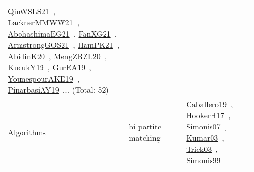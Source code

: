 {\begin{longtable}{lp{3cm}>{\raggedright\arraybackslash}p{6cm}>{\raggedright\arraybackslash}p{6cm}>{\raggedright\arraybackslash}p{8cm}}
\href{../works/QinWSLS21.pdf}{QinWSLS21}~\cite{QinWSLS21}, \href{../works/LacknerMMWW21.pdf}{LacknerMMWW21}~\cite{LacknerMMWW21}, \href{../works/AbohashimaEG21.pdf}{AbohashimaEG21}~\cite{AbohashimaEG21}, \href{../works/FanXG21.pdf}{FanXG21}~\cite{FanXG21}, \href{../works/ArmstrongGOS21.pdf}{ArmstrongGOS21}~\cite{ArmstrongGOS21}, \href{../works/HamPK21.pdf}{HamPK21}~\cite{HamPK21}, \href{../works/AbidinK20.pdf}{AbidinK20}~\cite{AbidinK20}, \href{../works/MengZRZL20.pdf}{MengZRZL20}~\cite{MengZRZL20}, \href{../works/KucukY19.pdf}{KucukY19}~\cite{KucukY19}, \href{../works/GurEA19.pdf}{GurEA19}~\cite{GurEA19}, \href{../works/YounespourAKE19.pdf}{YounespourAKE19}~\cite{YounespourAKE19}, \href{../works/PinarbasiAY19.pdf}{PinarbasiAY19}~\cite{PinarbasiAY19}... (Total: 52)\\
\index{bi-partite matching}\index{Algorithms!bi-partite matching}Algorithms & bi-partite matching &  &  & \href{../works/Caballero19.pdf}{Caballero19}~\cite{Caballero19}, \href{../works/HookerH17.pdf}{HookerH17}~\cite{HookerH17}, \href{../works/Simonis07.pdf}{Simonis07}~\cite{Simonis07}, \href{../works/Kumar03.pdf}{Kumar03}~\cite{Kumar03}, \href{../works/Trick03.pdf}{Trick03}~\cite{Trick03}, \href{../works/Simonis99.pdf}{Simonis99}~\cite{Simonis99}\\

\end{longtable}}
